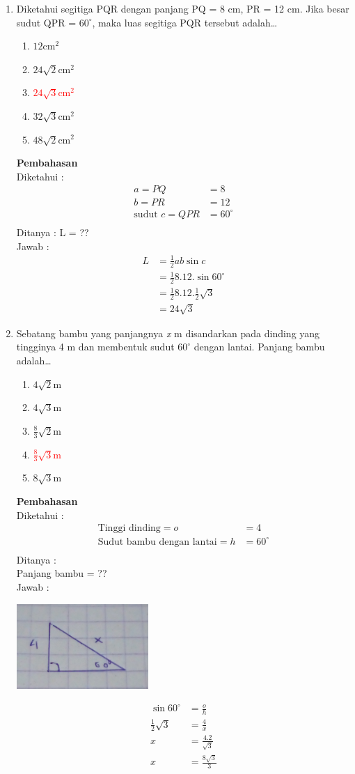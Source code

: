 \documentclass{report}
\newcommand{\options}[5]{
\begin{enumerate}[label=\alph*.]
	\item #1
	\item #2
	\item #3
	\item #4
	\item #5
\end{enumerate}
}
\newcommand{\pemb}{ \textbf{Pembahasan} \\}
\begin{document}
\begin{enumerate}
\item Diketahui segitiga PQR dengan panjang PQ = 8 cm, PR = 12 cm. Jika besar sudut QPR = $60^{\circ}$, maka luas segitiga PQR tersebut adalah\ldots
\options
{$12\text{cm}^2$}
{$24\sqrt{2}\text{cm}^2$}
{\textcolor{red}{$24\sqrt{3}\text{cm}^2$}}
{$32\sqrt{3}\text{cm}^2$}
{$48\sqrt{2}\text{cm}^2$}
\pemb
Diketahui :
\begin{align*}
	a = PQ &= 8 \\
	b = PR &= 12 \\
	\text{sudut } c = QPR &= 60^{\circ}\\
\end{align*}
Ditanya :
L = ?? \\
Jawab :
\begin{align*}
	L &= \frac{1}{2}ab\sin{c} \\
	   &= \frac{1}{2}8.12.\sin{60^{\circ}} \\
	   &= \frac{1}{2}8.12.\frac{1}{2}\sqrt{3} \\
	   &= 24\sqrt{3}
\end{align*}

\item Sebatang bambu yang panjangnya \emph{x} m disandarkan pada dinding yang tingginya 4 m dan membentuk sudut $60^{\circ}$ dengan lantai. Panjang bambu adalah\ldots
\options
{$4\sqrt{2}$m}
{$4\sqrt{3}$m}
{$\frac{8}{3}\sqrt{2}$m}
{\textcolor{red}{$\frac{8}{3}\sqrt{3}$m}}
{$8\sqrt{3}$m}
\pemb
Diketahui :
\begin{align*}
	\text{Tinggi dinding} = o &= 4\\
	\text{Sudut bambu dengan lantai} = h &= 60^{\circ}\\
\end{align*}
Ditanya : \\
Panjang bambu = ?? \\
Jawab : \\
\begin{center}
\includegraphics[valign=c,width=50mm,scale=0.5]{seg_19.jpg} \\
\end{center}
\begin{align*}
	\sin{60^{\circ}} &= \frac{o}{h} \\
	\frac{1}{2}\sqrt{3} &= \frac{4}{x} \\
	x &= \frac{4.2}{\sqrt{3}} \\
	x &= \frac{8\sqrt{3}}{3} \\
\end{align*}


\end{enumerate}
\end{document}
